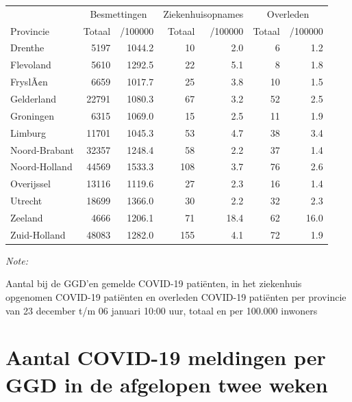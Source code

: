 \documentclass[
  english,
  man,floatsintext]{apa6}
\begin{document}
\begin{table}
\centering
\begin{threeparttable}
\begin{tabular}{lrrrrrr}
\toprule
\multicolumn{1}{c}{ } & \multicolumn{2}{c}{Besmettingen} & \multicolumn{2}{c}{Ziekenhuisopnames} & \multicolumn{2}{c}{Overleden} \\
\cmidrule(l{3pt}r{3pt}){2-3} \cmidrule(l{3pt}r{3pt}){4-5} \cmidrule(l{3pt}r{3pt}){6-7}
Provincie & Totaal & /100000 & Totaal & /100000 & Totaal & /100000\\
\midrule
Drenthe & 5197 & 1044.2 & 10 & 2.0 & 6 & 1.2\\
Flevoland & 5610 & 1292.5 & 22 & 5.1 & 8 & 1.8\\
FryslÃ¢n & 6659 & 1017.7 & 25 & 3.8 & 10 & 1.5\\
Gelderland & 22791 & 1080.3 & 67 & 3.2 & 52 & 2.5\\
Groningen & 6315 & 1069.0 & 15 & 2.5 & 11 & 1.9\\
Limburg & 11701 & 1045.3 & 53 & 4.7 & 38 & 3.4\\
Noord-Brabant & 32357 & 1248.4 & 58 & 2.2 & 37 & 1.4\\
Noord-Holland & 44569 & 1533.3 & 108 & 3.7 & 76 & 2.6\\
Overijssel & 13116 & 1119.6 & 27 & 2.3 & 16 & 1.4\\
Utrecht & 18699 & 1366.0 & 30 & 2.2 & 32 & 2.3\\
Zeeland & 4666 & 1206.1 & 71 & 18.4 & 62 & 16.0\\
Zuid-Holland & 48083 & 1282.0 & 155 & 4.1 & 72 & 1.9\\
\bottomrule
\end{tabular}
\begin{tablenotes}
\item \textit{Note: } 
\item Aantal bij de GGD’en gemelde COVID-19 patiënten, in het ziekenhuis opgenomen COVID-19 patiënten en overleden COVID-19 patiënten per provincie van 23 december t/m 06 januari 10:00 uur, totaal en per 100.000 inwoners
\end{tablenotes}
\end{threeparttable}
\end{table}

\newpage

\hypertarget{aantal-covid-19-meldingen-per-ggd-in-de-afgelopen-twee-weken}{%
\section{Aantal COVID-19 meldingen per GGD in de afgelopen twee weken}\label{aantal-covid-19-meldingen-per-ggd-in-de-afgelopen-twee-weken}}
\end{document}
